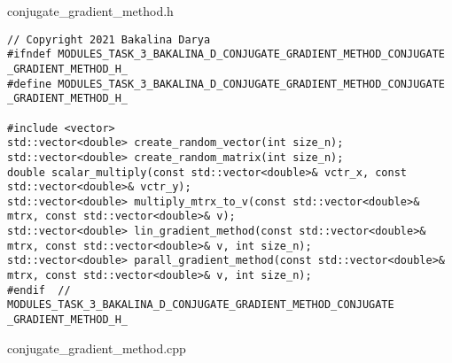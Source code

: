 \documentclass{report}
\begin{document}
conjugate\_gradient\_method.h
\begin{lstlisting}
// Copyright 2021 Bakalina Darya
#ifndef MODULES_TASK_3_BAKALINA_D_CONJUGATE_GRADIENT_METHOD_CONJUGATE
_GRADIENT_METHOD_H_
#define MODULES_TASK_3_BAKALINA_D_CONJUGATE_GRADIENT_METHOD_CONJUGATE
_GRADIENT_METHOD_H_

#include <vector>
std::vector<double> create_random_vector(int size_n);
std::vector<double> create_random_matrix(int size_n);
double scalar_multiply(const std::vector<double>& vctr_x, const std::vector<double>& vctr_y);
std::vector<double> multiply_mtrx_to_v(const std::vector<double>& mtrx, const std::vector<double>& v);
std::vector<double> lin_gradient_method(const std::vector<double>& mtrx, const std::vector<double>& v, int size_n);
std::vector<double> parall_gradient_method(const std::vector<double>& mtrx, const std::vector<double>& v, int size_n);
#endif  // MODULES_TASK_3_BAKALINA_D_CONJUGATE_GRADIENT_METHOD_CONJUGATE
_GRADIENT_METHOD_H_
\end{lstlisting}
conjugate\_gradient\_method.cpp
\end{document}
